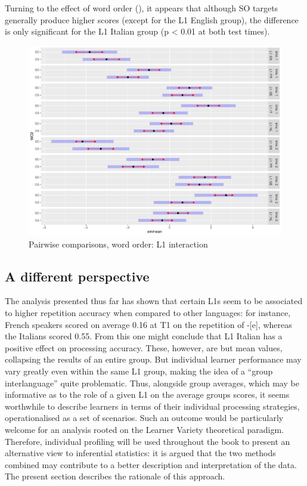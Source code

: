 Turning to the effect of word order (), it appears that although SO targets generally produce higher scores (except for the L1 English group), the difference is only significant for the L1 Italian group (p < 0.01 at both test times).

\begin{figure}[p]
    \includegraphics[height=.4\textheight]{figures/04-4.pdf}
    \caption{Pairwise comparisons, word order: L1 interaction}
    \label{fig:04:4}
\end{figure}

\clearpage
\subsection{A different perspective}\label{sec:04:2.4}

The analysis presented thus far has shown that certain L1s seem to be associated to higher repetition accuracy when compared to other languages: for instance, French speakers scored on average 0.16 at T1 on the repetition of -[e], whereas the Italians scored 0.55. From this one might conclude that L1 Italian has a positive effect on processing accuracy. These, however, are but mean values, collapsing the results of an entire group. But individual learner performance may vary greatly even within the same L1 group, making the idea of a ``group interlanguage'' quite problematic. Thus, alongside group averages, which may be informative as to the role of a given L1 on the average groups scores, it seems worthwhile to describe learners in terms of their individual processing strategies, operationalised as a set of scenarios. Such an outcome would be particularly welcome for an analysis rooted on the Learner Variety theoretical paradigm. Therefore, individual profiling will be used throughout the book to present an alternative view to inferential statistics: it is argued that  the two methods combined may contribute to a better description and interpretation of the data. The present section describes the rationale of this approach.

